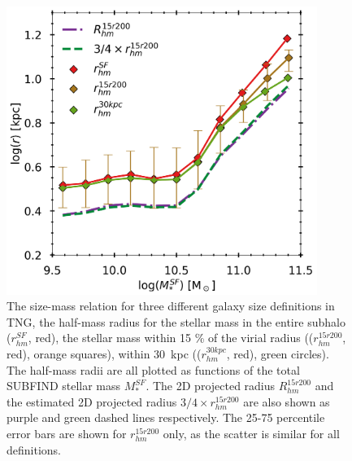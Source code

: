 \begin{figure}
    \centering
    \includegraphics[width=0.9\textwidth]{images/SM_R_tng.png}
    \caption{The size-mass relation for three different galaxy size definitions in TNG, the half-mass radius for the stellar mass in the entire subhalo ($r_{hm}^{SF}$, red), the stellar mass within 15 \% of the virial radius (($r_{hm}^{15r200}$, red), orange squares), within 30$\,$ kpc (($r_{hm}^{30kpc}$, red), green circles). The half-mass radii are all plotted as functions of the total SUBFIND stellar mass $M^{SF}_\ast$. The 2D projected radius $R_{hm}^{15r200}$ and the estimated 2D projected radius $3/4 \times r_{hm}^{15r200}$ are also shown as purple and green dashed lines respectively. The 25-75 percentile error bars are shown for $r^{15r200}_{hm}$ only, as the scatter is similar for all definitions.}
    \label{SM_R_TNG}
\end{figure}


